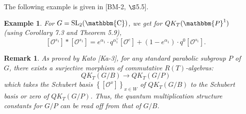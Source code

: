 \documentclass{article}
\newtheorem{remark}[theorem]{Remark}
\newtheorem{example}[theorem]{Example}
\def\mathbb{\mathbbm}
\def\ref#1{#1}
\def\SL{\rm{SL}}
\begin{document}
The following example is given in [BM-2, $\S$5.5].
\begin{example} For $G=\SL_2(\mathbb{C})$, we get for $QK_T(\mathbb{P}^1)$ (using Corollary \ref{7.3} and Theorem \ref{5.9}),
$$[\mathcal{O}^{s_1}] * [\mathcal{O}^{s_1}] = e^{\alpha_1}\cdot q^{\alpha^\vee_1} [\mathcal{O}^e]+ (1- e^{\alpha_1})\cdot q^0  [\mathcal{O}^{s_1}].$$
\end{example}


\begin{remark} \label{7.8} \rm{
As proved by Kato [Ka-3], for any standard parabolic subgroup $P$ of $G$, there exists a surjective morphism of commutative $R(T)$-algebras:
$$
QK_T(G/B)\rightarrow QK_T(G/P)
$$
which takes the Schubert basis $\left\{ \left[ \mathcal{O}^x\right] \right\}_{x\in W}$ of $QK_T(G/B)$ to the Schubert basis or zero of $QK_T(G/P)$. Thus, the quantum multiplication structure constants for $G/P$ can be read off from that of $G/B$. }
\end{remark}
\end{document}
